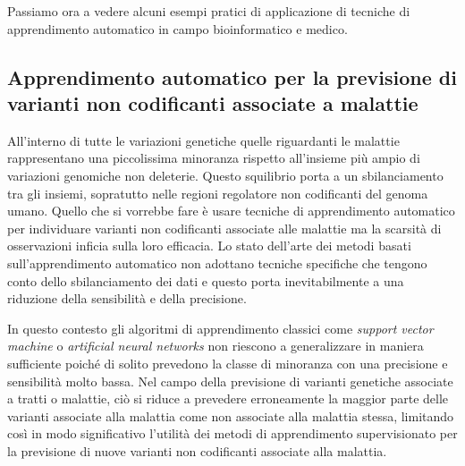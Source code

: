 \documentclass[12pt,italian]{report}
\begin{document}
	
	Passiamo ora a vedere alcuni esempi pratici di applicazione di tecniche di apprendimento automatico in campo bioinformatico e medico.
	
	\subsection{Apprendimento automatico per la previsione di varianti non codificanti associate a malattie}
	All'interno di tutte le variazioni genetiche quelle riguardanti le malattie rappresentano una piccolissima minoranza rispetto all'insieme più ampio di variazioni genomiche non deleterie. Questo squilibrio porta a un sbilanciamento tra gli insiemi, sopratutto nelle regioni regolatore non codificanti del genoma umano. 
	Quello che si vorrebbe fare è usare tecniche di apprendimento automatico per individuare varianti non codificanti associate alle malattie ma la scarsità di osservazioni inficia sulla loro efficacia. Lo stato dell'arte dei metodi basati sull'apprendimento automatico non adottano tecniche specifiche che tengono conto dello sbilanciamento dei dati e questo porta inevitabilmente a una riduzione della sensibilità e della precisione.
	
	In questo contesto gli algoritmi di apprendimento classici come \textit{support vector machine} \cite{Cortes1995} o \textit{artificial neural networks} \cite{bishop1995neural} non riescono a generalizzare in maniera sufficiente poiché di solito prevedono la classe di minoranza con una precisione e sensibilità molto bassa.
	Nel campo della previsione di varianti genetiche associate a tratti o malattie, ciò si riduce a prevedere erroneamente la maggior parte delle varianti associate alla malattia come non associate alla malattia stessa, limitando così in modo significativo l'utilità dei metodi di apprendimento supervisionato per la previsione di nuove varianti non codificanti associate alla malattia.
	
\end{document}

